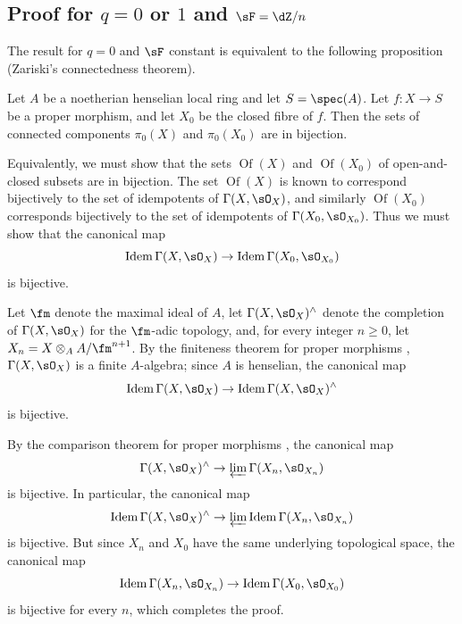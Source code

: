 \subsection{Proof for \texorpdfstring{$q=0$}{q=0} or \texorpdfstring{$1$}{1} and \texorpdfstring{$\sF=\dZ/n$}{\sF=Z/n}}\label{I:4-2}

The result for $q=0$ and $\sF$ constant is equivalent to the following
proposition (Zariski's connectedness theorem).

\begin{proposition}\label{I:4-2-1}
Let $A$ be a noetherian henselian local ring and let $S=\spec(A)$. Let
$f:X\to S$ be a proper morphism, and let $X_0$ be the closed fibre of
$f$. Then the sets of connected components $\pi_0(X)$ and
$\pi_0(X_0)$ are in bijection.
\end{proposition}

Equivalently, we must show that the sets $\operatorname{Of}(X)$ and
$\operatorname{Of}(X_0)$ of open-and-closed subsets are in bijection.
The set $\operatorname{Of}(X)$ is known to correspond bijectively to the
set of idempotents of $\Gamma(X,\sO_X)$, and similarly
$\operatorname{Of}(X_0)$ corresponds bijectively to the set of
idempotents of $\Gamma(X_0,\sO_{X_0})$. Thus we must show that the
canonical map
\[
  \operatorname{Idem} \Gamma(X,\sO_X) \to \operatorname{Idem}\Gamma(X_0,\sO_{X_0})
\]
is bijective.

Let $\fm$ denote the maximal ideal of $A$, let
$\Gamma(X,\sO_X)^\wedge$ denote the completion of $\Gamma(X,\sO_X)$
for the $\fm$-adic topology, and, for every integer $n\geqslant0$, let
$X_n=X\otimes_AA/\fm^{n+1}$. By the finiteness theorem for proper
morphisms , $\Gamma(X,\sO_X)$ is a finite
$A$-algebra; since $A$ is henselian, the canonical map
\[
  \operatorname{Idem} \Gamma(X,\sO_X) \to \operatorname{Idem}\Gamma(X,\sO_X)^\wedge
\]
is bijective.

By the comparison theorem for proper morphisms , the canonical map
\[ \Gamma(X,\sO_X)^\wedge \to \varprojlim \Gamma(X_n,\sO_{X_n}) \]
is bijective. In particular, the canonical map \[ \operatorname{Idem} \Gamma(X,\sO_X)^\wedge \to \varprojlim \operatorname{Idem}\Gamma(X_n,\sO_{X_n})
\]
is bijective. But since $X_n$ and $X_0$ have the same underlying
topological space, the canonical map
\[
  \operatorname{Idem}\Gamma(X_n,\sO_{X_n}) \to \operatorname{Idem} \Gamma(X_0,\sO_{X_0})
\]
is bijective for every $n$, which completes the proof.

